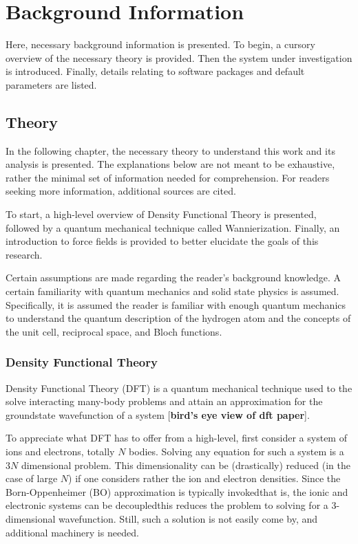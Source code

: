 \chapter{Background Information}   

Here, necessary background information is presented. To begin, a cursory overview of the necessary theory is provided. Then the system under investigation is introduced. Finally, details relating to software packages and default parameters are listed.
    
    \section{Theory}
    
    In the following chapter, the necessary theory to understand this work and its analysis is presented. The explanations below are not meant to be exhaustive, rather the minimal set of information needed for comprehension. For readers seeking more information, additional sources are cited.
    
    To start, a high-level overview of Density Functional Theory is presented, followed by a quantum mechanical technique called Wannierization. Finally, an introduction to force fields is provided to better elucidate the goals of this research.
    
    Certain assumptions are made regarding the reader's background knowledge. A certain familiarity with quantum mechanics and solid state physics is assumed. Specifically, it is assumed the reader is familiar with enough quantum mechanics to understand the quantum description of the hydrogen atom and the concepts of the unit cell, reciprocal space, and Bloch functions. 
    
    \subsection{Density Functional Theory}
    
    Density Functional Theory (DFT) is a quantum mechanical technique used to the solve interacting many-body problems and attain an approximation for the groundstate wavefunction of a system [\textbf{bird's eye view of dft paper}]. 
    
    To appreciate what DFT has to offer from a high-level, first consider a system of ions and electrons, totally $N$ bodies. Solving any equation for such a system is a $3N$ dimensional problem. This dimensionality can be (drastically) reduced (in the case of large $N$) if one considers rather the ion and electron densities. Since the Born-Oppenheimer (BO) approximation is typically invoked\textemdash that is, the ionic and electronic systems can be decoupled\textemdash this reduces the problem to solving for a 3-dimensional wavefunction. Still, such a solution is not easily come by, and additional machinery is needed.
    
